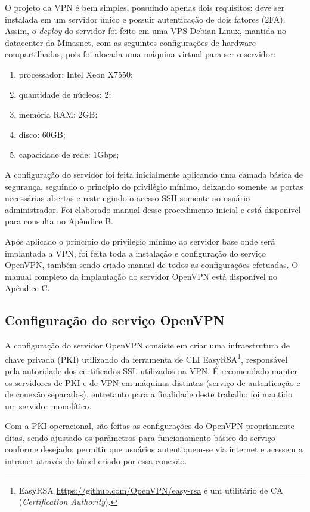     O projeto da VPN é bem simples, possuindo apenas dois requisitos: deve ser instalada em um servidor único e possuir autenticação de dois fatores (2FA). Assim, o \textit{deploy} do servidor foi feito em uma VPS Debian Linux, mantida no datacenter da Minasnet, com as seguintes configurações de hardware compartilhadas, pois foi alocada uma máquina virtual para ser o servidor:
    
    \begin{enumerate}[label=\alph*)]
        \item processador: Intel Xeon X7550;
        \item quantidade de núcleos: 2;
        \item memória RAM: 2GB;
        \item disco: 60GB;
        \item capacidade de rede: 1Gbps;
    \end{enumerate}
    
    A configuração do servidor foi feita inicialmente aplicando uma camada básica de segurança, seguindo o princípio do privilégio mínimo, deixando somente as portas necessárias abertas e restringindo o acesso SSH somente ao usuário administrador. Foi elaborado manual desse procedimento inicial e está disponível para consulta no Apêndice B.
    
    Após aplicado o princípio do privilégio mínimo ao servidor base onde será implantada a VPN, foi feita toda a instalação e configuração do serviço OpenVPN, também sendo criado manual de todos as configurações efetuadas. O manual completo da implantação do servidor OpenVPN está disponível no Apêndice C.
    
\subsection{Configuração do serviço OpenVPN}
    
    A configuração do servidor OpenVPN consiste em criar uma infraestrutura de chave privada (PKI) utilizando da ferramenta de CLI EasyRSA\footnote{EasyRSA \url{https://github.com/OpenVPN/easy-rsa} é um utilitário de CA (\textit{Certification Authority}).}, responsável pela autoridade dos certificados SSL utilizados na VPN. É recomendado manter os servidores de PKI e de VPN em máquinas distintas (serviço de autenticação e de conexão separados), entretanto para a finalidade deste trabalho foi mantido um servidor monolítico.
    
    Com a PKI operacional, são feitas as configurações do OpenVPN propriamente ditas, sendo ajustado os parâmetros para funcionamento básico do serviço conforme desejado: permitir que usuários autentiquem-se via internet e acessem a intranet através do túnel criado por essa conexão.
    
